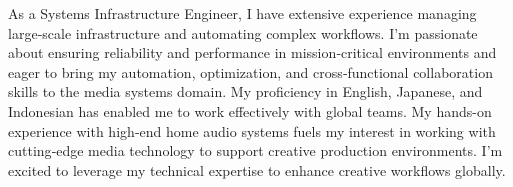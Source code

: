 

\begin{cvparagraph}

As a Systems Infrastructure Engineer, I have extensive experience managing large‑scale infrastructure and automating complex workflows. I’m passionate about ensuring reliability and performance in mission‑critical environments and eager to bring my automation, optimization, and cross‑functional collaboration skills to the media systems domain. My proficiency in English, Japanese, and Indonesian has enabled me to work effectively with global teams. My hands-on experience with high‑end home audio systems fuels my interest in working with cutting‑edge media technology to support creative production environments. I'm excited to leverage my technical expertise to enhance creative workflows globally.
\end{cvparagraph}
